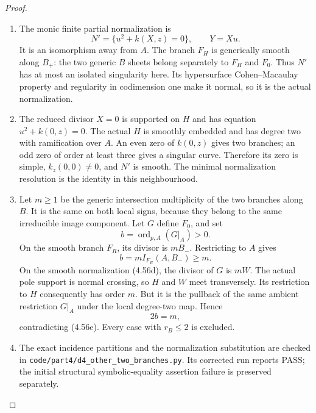 \begin{proof}
\begin{enumerate}[label={$\langle1\rangle$\arabic*.},leftmargin=*]
\item The monic finite partial normalization is
\[
      N'=\{u^2+k(X,z)=0\},\qquad Y=Xu.
                                                            \tag{4.56d}
\]
It is an isomorphism away from $A$. The branch $F_H$
is generically smooth along $B_+$: the two generic
$B$ sheets belong separately to $F_H$ and $F_0$.
Thus $N'$ has at most an isolated singularity here.
Its hypersurface Cohen--Macaulay property and regularity
in codimension one make it normal, so it is the actual
normalization.

\item The reduced divisor $X=0$ is supported on $H$ and has
equation $u^2+k(0,z)=0$. The actual $H$ is smoothly
embedded and has degree two with ramification over $A$.
An even zero of $k(0,z)$ gives two branches; an odd
zero of order at least three gives a singular curve.
Therefore its zero is simple, $k_z(0,0)\ne0$, and
$N'$ is smooth. The minimal normalization resolution
is the identity in this neighbourhood.

\item Let $m\ge1$ be the generic intersection multiplicity of
the two branches along $B$. It is the same on both
local signs, because they belong to the same irreducible
image component. Let $G$ define $F_0$, and set
\[
                      b=\operatorname{ord}_{p,A}(G|_A)>0.
\]
On the smooth branch $F_R$, its divisor is $mB_-$.
Restricting to $A$ gives
\[
                 b=m I_{F_R}(A,B_-)\ge m.                \tag{4.56e}
\]
On the smooth normalization (4.56d), the divisor of $G$
is $mW$. The actual pole support is normal crossing,
so $H$ and $W$ meet transversely. Its restriction to
$H$ consequently has order $m$. But it is the pullback
of the same ambient restriction $G|_A$ under the local
degree-two map. Hence
\[
                              2b=m,
\]
contradicting (4.56e). Every case with $r_B\le2$ is
excluded.

\item The exact incidence partitions and the normalization
substitution are checked in
\texttt{code/part4/d4\_other\_two\_branches.py}.
Its corrected run reports PASS; the initial structural
symbolic-equality assertion failure is preserved separately.

\end{enumerate}
\end{proof}
